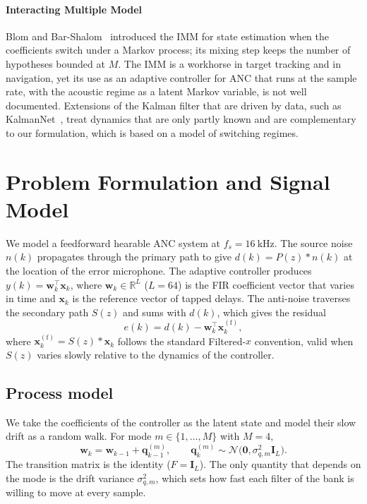 \documentclass[conference]{IEEEtran}
\begin{document}
\paragraph{Interacting Multiple Model} Blom and
Bar-Shalom~\cite{BarShalom:imm88} introduced the IMM for state estimation when the
coefficients switch under a Markov process; its mixing step keeps the number of
hypotheses bounded at $M$. The IMM is a workhorse in target tracking and in
navigation, yet its use as an adaptive controller for ANC that runs at the sample
rate, with the acoustic regime as a latent Markov variable, is not well documented.
Extensions of the Kalman filter that are driven by data, such as
KalmanNet~\cite{Revach:tsp22}, treat dynamics that are only partly known and are
complementary to our formulation, which is based on a model of switching regimes.

\section{Problem Formulation and Signal Model}

We model a feedforward hearable ANC system at $f_s = \SI{16}{\kilo\hertz}$. The
source noise $n(k)$ propagates through the primary path to give $d(k) = P(z)\ast
n(k)$ at the location of the error microphone. The adaptive controller produces
$y(k) = \mathbf{w}_k^\top \mathbf{x}_k$, where $\mathbf{w}_k \in \mathbb{R}^L$
($L=64$) is the FIR coefficient vector that varies in time and $\mathbf{x}_k$ is the
reference vector of tapped delays. The anti-noise traverses the secondary path
$S(z)$ and sums with $d(k)$, which gives the residual
\begin{equation}
e(k) = d(k) - \mathbf{w}_k^\top \mathbf{x}_k^{(\mathrm f)},
\label{eq:residual}
\end{equation}
where $\mathbf{x}_k^{(\mathrm f)} = S(z)\ast \mathbf{x}_k$ follows the standard
Filtered-$x$ convention, valid when $S(z)$ varies slowly relative to the dynamics of
the controller.

\subsection{Process model}
We take the coefficients of the controller as the latent state and model their slow
drift as a random walk. For mode $m\in\{1,\dots,M\}$ with $M=4$,
\begin{equation}
\mathbf{w}_k = \mathbf{w}_{k-1} + \mathbf{q}_{k-1}^{(m)}, \qquad
\mathbf{q}_k^{(m)} \sim \mathcal{N}\!\big(\mathbf{0}, \sigma_{q,m}^2 \mathbf{I}_L\big).
\label{eq:process}
\end{equation}
The transition matrix is the identity ($F=\mathbf{I}_L$). The only quantity that
depends on the mode is the drift variance $\sigma_{q,m}^2$, which sets how fast each
filter of the bank is willing to move at every sample.
\end{document}
